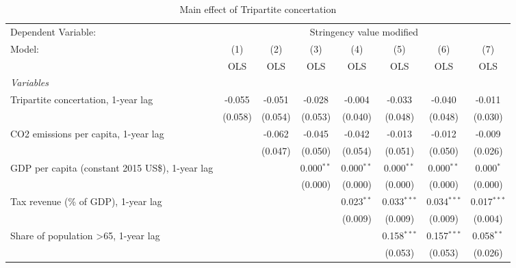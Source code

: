 
\begin{table}[htbp]
   \caption{Main effect of Tripartite concertation}
   \centering
   \begin{tabular}{lccccccc}
      \toprule
      Dependent Variable: & \multicolumn{7}{c}{Stringency value modified}\\
      Model:                                                & (1)     & (2)     & (3)          & (4)          & (5)           & (6)           & (7)\\  
                                                            &  OLS    & OLS     & OLS          & OLS          & OLS           & OLS           & OLS\\  
      \midrule
      \emph{Variables}\\
      Tripartite concertation, 1-year lag                   & -0.055  & -0.051  & -0.028       & -0.004       & -0.033        & -0.040        & -0.011\\   
                                                            & (0.058) & (0.054) & (0.053)      & (0.040)      & (0.048)       & (0.048)       & (0.030)\\   
      CO2 emissions per capita, 1-year lag                  &         & -0.062  & -0.045       & -0.042       & -0.013        & -0.012        & -0.009\\   
                                                            &         & (0.047) & (0.050)      & (0.054)      & (0.051)       & (0.050)       & (0.026)\\   
      GDP per capita (constant 2015 US\$), 1-year lag       &         &         & 0.000$^{**}$ & 0.000$^{**}$ & 0.000$^{**}$  & 0.000$^{**}$  & 0.000$^{*}$\\   
                                                            &         &         & (0.000)      & (0.000)      & (0.000)       & (0.000)       & (0.000)\\   
      Tax revenue (\% of GDP), 1-year lag                   &         &         &              & 0.023$^{**}$ & 0.033$^{***}$ & 0.034$^{***}$ & 0.017$^{***}$\\   
                                                            &         &         &              & (0.009)      & (0.009)       & (0.009)       & (0.004)\\   
      Share of population >65, 1-year lag                   &         &         &              &              & 0.158$^{***}$ & 0.157$^{***}$ & 0.058$^{**}$\\   
                                                            &         &         &              &              & (0.053)       & (0.053)       & (0.026)\\   

\end{tabular}
\end{table}
